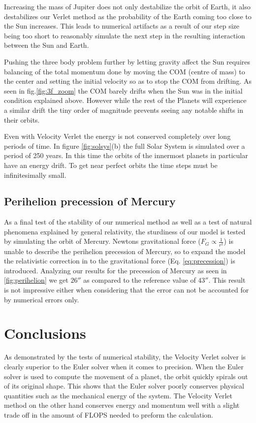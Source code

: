 \documentclass{emulateapj}
\begin{document}
Increasing the mass of Jupiter does not only destabilize the orbit of Earth, it also destabilizes our Verlet method as the probability of the Earth coming too close to the Sun increases. This leads to numerical artifacts as a result of our step size being too short to reasonably simulate the next step in the resulting interaction between the Sun and Earth.

Pushing the three body problem further by letting gravity affect the Sun requires balancing of the total momentum done by moving the COM (centre of mass) to the center and setting the initial velocity so as to stop the COM from drifting. As seen in fig.\ref{fig:3f_zoom} the COM barely drifts when the Sun was in the initial condition explained above. However while the rest of the Planets will experience a similar drift the tiny order of magnitude prevents seeing any notable shifts in their orbits.

Even with Velocity Verlet the energy is not conserved completely over long periods of time. In figure \ref{fig:solsys}(b) the full Solar System is simulated over a period of 250 years. In this time the orbits of the innermost planets in particular have an energy drift. To get near perfect orbits the time steps must be infinitesimally small.


\subsection{Perihelion precession of Mercury}
As a final test of the stability of our numerical method as well as a test of natural phenomena explained by general relativity, the sturdiness of our model is tested by simulating the orbit of Mercury. Newtons gravitational force ($F_G \propto \frac{1}{r^{2}}$) is unable to describe the perihelion precession of Mercury, so to expand the model the relativistic correction in to the gravitational force (Eq. \eqref{eq:precession}) is introduced. Analyzing our results for the precession of Mercury as seen in \ref{fig:perihelion} we get $26''$ as compared to the reference value of $43''$. This result is not impressive either when considering that the error can not be accounted for by numerical errors only.



\section{Conclusions}
\label{sec:conclusions}

As demonstrated by the tests of numerical stability, the Velocity Verlet solver is clearly superior to the Euler solver when it comes to precision. When the Euler solver is used to compute the movement of a planet, the orbit quickly spirals out of its original shape. This shows that the Euler solver poorly conserves physical quantities such as the mechanical energy of the system. The Velocity Verlet method on the other hand conserves energy and momentum well with a slight trade off in the amount of FLOPS needed to preform the calculation.
\end{document}
